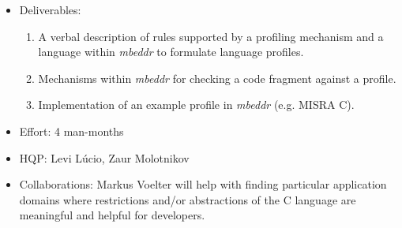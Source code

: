 \begin{itemize}
  \item Deliverables:
  \begin{enumerate}
    \item A verbal description of rules supported by a profiling mechanism and a
    language within \emph{mbeddr} to formulate language profiles.
    \item Mechanisms within \emph{mbeddr} for checking a code fragment against a
    profile.
    \item Implementation of an example profile in \emph{mbeddr} (e.g. MISRA
    C).
  \end{enumerate}
  \item Effort: 4 man-months
  \item HQP: Levi L\'ucio, Zaur Molotnikov
  \item Collaborations: Markus Voelter will help with finding
  particular application domains where restrictions and/or abstractions of the C
  language are meaningful and helpful for developers.
\end{itemize}

